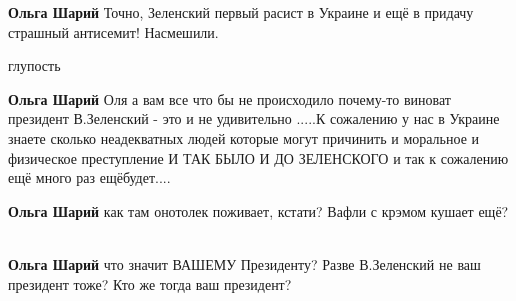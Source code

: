 \begin{itemize}
\begin{itemize}
 
\textbf{Ольга Шарий} Точно, Зеленский первый расист в Украине и ещё в придачу страшный антисемит! Насмешили.

 
глупость

 
\textbf{Ольга Шарий} Оля а вам все что бы не происходило почему-то виноват
президент В.Зеленский - это и не удивительно .....К сожалению у нас в Украине
знаете сколько неадекватных людей которые могут причинить и моральное и
физическое преступление И ТАК БЫЛО И ДО ЗЕЛЕНСКОГО и так к сожалению ещё много
раз ещёбудет....

 
\textbf{Ольга Шарий} как там онотолек поживает, кстати? Вафли с крэмом кушает ещё?🤔

 
\textbf{Ольга Шарий} что значит ВАШЕМУ Президенту? Разве В.Зеленский не ваш президент тоже? Кто же тогда ваш президент?

 

\end{itemize}
\end{itemize}
